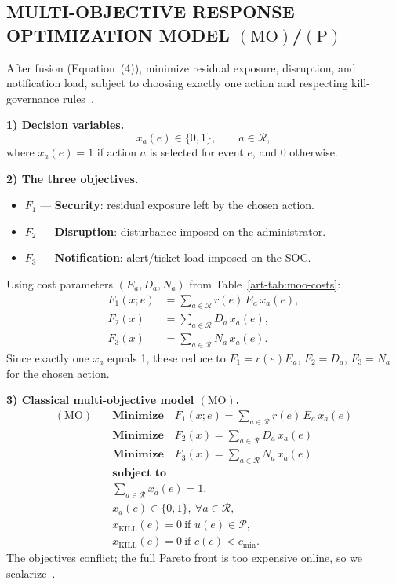 \subsection{MULTI-OBJECTIVE RESPONSE OPTIMIZATION MODEL $(\mathrm{MO})$/$(\mathrm{P})$}
After fusion (Equation~(4)), minimize residual exposure, disruption, and notification load, subject to choosing exactly one action and respecting kill-governance rules~\cite{ref14,ref15}.

\textbf{1) Decision variables.}
\begin{equation}
x_a(e)\in\{0,1\}, \qquad a\in\mathcal{R},
\tag{5.0}
\end{equation}
where $x_a(e)=1$ if action $a$ is selected for event $e$, and $0$ otherwise.

\textbf{2) The three objectives.}
\begin{itemize}
\item $F_1$ --- \textbf{Security}: residual exposure left by the chosen action.
\item $F_2$ --- \textbf{Disruption}: disturbance imposed on the administrator.
\item $F_3$ --- \textbf{Notification}: alert/ticket load imposed on the SOC.
\end{itemize}
Using cost parameters $(E_a,D_a,N_a)$ from Table~\ref{art-tab:moo-costs}:
\begin{align}
F_1(x;e)
&=
\sum_{a\in\mathcal{R}} r(e)\, E_a\, x_a(e),
\tag{5.1}\\
F_2(x)
&=
\sum_{a\in\mathcal{R}} D_a\, x_a(e),
\tag{5.2}\\
F_3(x)
&=
\sum_{a\in\mathcal{R}} N_a\, x_a(e).
\tag{5.3}
\end{align}
Since exactly one $x_a$ equals 1, these reduce to $F_1=r(e)E_a$, $F_2=D_a$, $F_3=N_a$ for the chosen action.

\textbf{3) Classical multi-objective model $(\mathrm{MO})$.}
\begin{equation}
\begin{aligned}
(\mathrm{MO})\quad
& \textbf{Minimize}\quad F_1(x;e)=\sum_{a\in\mathcal{R}} r(e)\, E_a\, x_a(e) \\
& \textbf{Minimize}\quad F_2(x)=\sum_{a\in\mathcal{R}} D_a\, x_a(e) \\
& \textbf{Minimize}\quad F_3(x)=\sum_{a\in\mathcal{R}} N_a\, x_a(e) \\[0.35em]
& \textbf{subject to} \\
& \sum_{a\in\mathcal{R}} x_a(e)=1, \\
& x_a(e)\in\{0,1\},\ \forall a\in\mathcal{R}, \\
& x_{\mathrm{KILL}}(e)=0\ \text{if } u(e)\in\mathcal{P}, \\
& x_{\mathrm{KILL}}(e)=0\ \text{if } c(e)<c_{\min}.
\end{aligned}
\tag{5}\label{art-eq:moo-vector}
\end{equation}
The objectives conflict; the full Pareto front is too expensive online, so we scalarize~\cite{ref14}.


